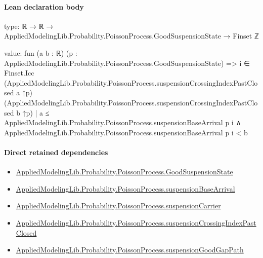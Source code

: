 \documentclass[10pt]{article}
\begin{document}
\paragraph{Lean declaration body}
\begin{ReviewVerbatim}
type:
ℝ → ℝ → AppliedModelingLib.Probability.PoissonProcess.GoodSuspensionState → Finset ℤ

value:
fun (a b : ℝ) (p : AppliedModelingLib.Probability.PoissonProcess.GoodSuspensionState) =>
  {i ∈
      Finset.Icc (AppliedModelingLib.Probability.PoissonProcess.suspensionCrossingIndexPastClosed a ↑p)
        (AppliedModelingLib.Probability.PoissonProcess.suspensionCrossingIndexPastClosed b ↑p) |
    a ≤ AppliedModelingLib.Probability.PoissonProcess.suspensionBaseArrival p i ∧
      AppliedModelingLib.Probability.PoissonProcess.suspensionBaseArrival p i < b}
\end{ReviewVerbatim}

\paragraph{Direct retained dependencies}
\begin{itemize}\raggedright
\item \hyperlink{governing-declaration-ab1cfe37ad8c32b0}{Applied\allowbreak{}Modeling\allowbreak{}Lib.\allowbreak{}Probability.\allowbreak{}Poisson\allowbreak{}Process.\allowbreak{}Good\allowbreak{}Suspension\allowbreak{}State}
\item \hyperlink{governing-declaration-c513c48a384a886a}{Applied\allowbreak{}Modeling\allowbreak{}Lib.\allowbreak{}Probability.\allowbreak{}Poisson\allowbreak{}Process.\allowbreak{}suspension\allowbreak{}Base\allowbreak{}Arrival}
\item \hyperlink{governing-declaration-f492363c01e8969e}{Applied\allowbreak{}Modeling\allowbreak{}Lib.\allowbreak{}Probability.\allowbreak{}Poisson\allowbreak{}Process.\allowbreak{}suspension\allowbreak{}Carrier}
\item \hyperlink{governing-declaration-79e7fd2195dfecc3}{Applied\allowbreak{}Modeling\allowbreak{}Lib.\allowbreak{}Probability.\allowbreak{}Poisson\allowbreak{}Process.\allowbreak{}suspension\allowbreak{}Crossing\allowbreak{}Index\allowbreak{}Past\allowbreak{}Closed}
\item \hyperlink{governing-declaration-446bfa9c60d40523}{Applied\allowbreak{}Modeling\allowbreak{}Lib.\allowbreak{}Probability.\allowbreak{}Poisson\allowbreak{}Process.\allowbreak{}suspension\allowbreak{}Good\allowbreak{}Gap\allowbreak{}Path}
\end{itemize}
\hypertarget{governing-declaration-a5c5dbd6c5850d8d}{}
\end{document}
